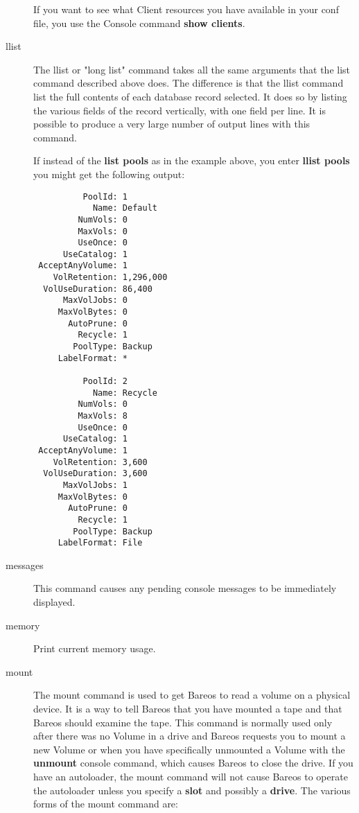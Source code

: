\begin{description}
   If you want to see what Client resources you have available in your conf
   file, you use the Console command {\bf show clients}.

\item [llist]
   The llist or "long list" command takes all the same arguments that the
   list command described above does.  The difference is that the llist
   command list the full contents of each database record selected.  It
   does so by listing the various fields of the record vertically, with one
   field per line.  It is possible to produce a very large number of output
   lines with this command.

   If instead of the {\bf list pools} as in the example above, you enter
   {\bf llist pools} you might get the following output:

\footnotesize
\begin{verbatim}
          PoolId: 1
            Name: Default
         NumVols: 0
         MaxVols: 0
         UseOnce: 0
      UseCatalog: 1
 AcceptAnyVolume: 1
    VolRetention: 1,296,000
  VolUseDuration: 86,400
      MaxVolJobs: 0
     MaxVolBytes: 0
       AutoPrune: 0
         Recycle: 1
        PoolType: Backup
     LabelFormat: *

          PoolId: 2
            Name: Recycle
         NumVols: 0
         MaxVols: 8
         UseOnce: 0
      UseCatalog: 1
 AcceptAnyVolume: 1
    VolRetention: 3,600
  VolUseDuration: 3,600
      MaxVolJobs: 1
     MaxVolBytes: 0
       AutoPrune: 0
         Recycle: 1
        PoolType: Backup
     LabelFormat: File

\end{verbatim}
\normalsize

\item [messages]
   This command causes any pending  console messages to be immediately displayed.

\item [memory]
   Print current memory usage.


\item [mount]
   The mount command is used to get Bareos to read a volume on a physical
   device.  It is a way to tell Bareos that you have mounted a tape and
   that Bareos should examine the tape.  This command is normally
   used only after there was no Volume in a drive and Bareos requests you to mount a new
   Volume or when you have specifically unmounted a Volume with the {\bf
   unmount} console command, which causes Bareos to close the drive.  If
   you have an autoloader, the mount command will not cause Bareos to
   operate the autoloader unless you specify a {\bf slot} and possibly a
   {\bf drive}. The various forms of the mount command are:


\end{description}
